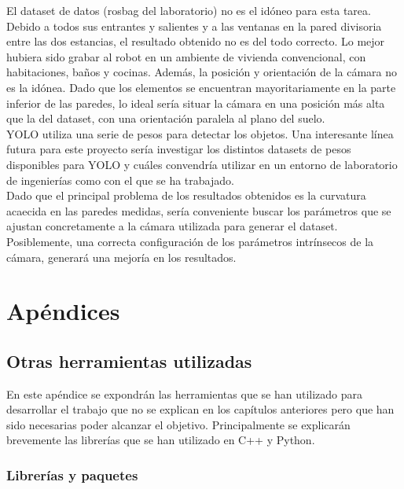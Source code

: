 El dataset de datos (rosbag del laboratorio) no es el idóneo para esta tarea. Debido a todos sus entrantes y salientes y a las ventanas en la pared divisoria entre las dos estancias, el resultado obtenido no es del todo correcto. Lo mejor hubiera sido grabar al robot en un ambiente de vivienda convencional, con habitaciones, baños y cocinas. Además, la posición y orientación de la cámara no es la idónea. Dado que los elementos se encuentran mayoritariamente en la parte inferior de las paredes, lo ideal sería situar la cámara en una posición más alta que la del dataset, con una orientación paralela al plano del suelo.\\

YOLO utiliza una serie de pesos para detectar los objetos. Una interesante línea futura para este proyecto sería investigar los distintos datasets de pesos disponibles para YOLO y cuáles convendría utilizar en un entorno de laboratorio de ingenierías como con el que se ha trabajado.\\

Dado que el principal problema de los resultados obtenidos es la curvatura acaecida en las paredes medidas, sería conveniente buscar los parámetros que se ajustan concretamente a la cámara utilizada para generar el dataset. Posiblemente, una correcta configuración de los parámetros intrínsecos de la cámara, generará una mejoría en los resultados.\\


\part{Apéndices}

\appendix

\chapter{Otras herramientas utilizadas}

En este apéndice se expondrán las herramientas que se han utilizado para desarrollar el trabajo que no se explican en los capítulos anteriores pero que han sido necesarias poder alcanzar el objetivo. Principalmente se explicarán brevemente las librerías que se han utilizado en C++ y Python.\\

\section{Librerías y paquetes}

